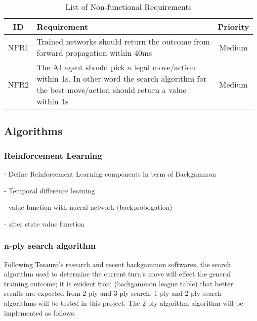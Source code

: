 \documentclass[12pt,a4paper]{article}
\begin{document}
\begin{table}[htb]
    \centering
    \caption{List of Non-functional Requirements}
    \vspace*{6pt}
    \label{nonreq}
    \begin{tabular}{cp{12cm}c}
        \hline
        \hline
        ID & Requirement & Priority \\ 
        \hline
        NFR1 & Trained networks should return the outcome from forward propagation within 40ms & Medium \\
        \hline
        NFR2 & The AI agent should pick a legal move/action within 1s. In other word the search algorithm for the best move/action should return a value within 1s & Medium \\
        \hline
    \end{tabular}
\end{table}
\subsection{Algorithms}
\subsubsection{Reinforcement Learning}
- Define Reinforcement Learning components in term of Backgammon

- Temporal difference learning

- value function with nueral network (backprobogation)

- after state value function

\subsubsection{n-ply search algorithm}
Following Tesauro's research and recent backgammon softwares, the search algorithm used to determine the current turn's move will effect the general training outcome; it is evident from (backgammon league table) that better results are expected from 2-ply and 3-ply search. 1-ply and 2-ply search algorithms will be tested in this project. The 2-ply algorithm algorithm will be implemented as follows:
\end{document}
